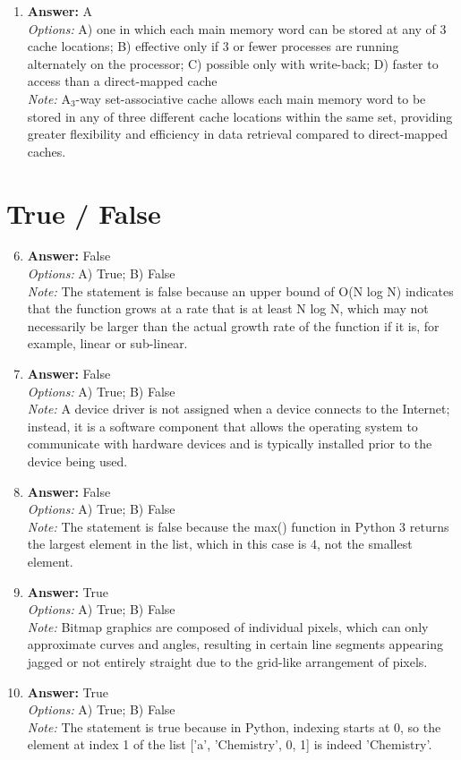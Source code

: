 \documentclass[12pt]{article}
\begin{document}
\begin{enumerate}[label=\arabic*.]
\item \textbf{Answer:} A
\\ \textit{Options:} A) one in which each main memory word can be stored at any of 3 cache locations; B) effective only if 3 or fewer processes are running alternately on the processor; C) possible only with write-back; D) faster to access than a direct-mapped cache
\\ \textit{Note:} A$_{3}$-way set-associative cache allows each main memory word to be stored in any of three different cache locations within the same set, providing greater flexibility and efficiency in data retrieval compared to direct-mapped caches.
\end{enumerate}

\section*{True / False}
\begin{enumerate}[label=\arabic*.]
\setcounter{enumi}{5}
\item \textbf{Answer:} False
\\ \textit{Options:} A) True; B) False
\\ \textit{Note:} The statement is false because an upper bound of O(N log N) indicates that the function grows at a rate that is at least N log N, which may not necessarily be larger than the actual growth rate of the function if it is, for example, linear or sub-linear.
\item \textbf{Answer:} False
\\ \textit{Options:} A) True; B) False
\\ \textit{Note:} A device driver is not assigned when a device connects to the Internet; instead, it is a software component that allows the operating system to communicate with hardware devices and is typically installed prior to the device being used.
\item \textbf{Answer:} False
\\ \textit{Options:} A) True; B) False
\\ \textit{Note:} The statement is false because the max() function in Python 3 returns the largest element in the list, which in this case is 4, not the smallest element.
\item \textbf{Answer:} True
\\ \textit{Options:} A) True; B) False
\\ \textit{Note:} Bitmap graphics are composed of individual pixels, which can only approximate curves and angles, resulting in certain line segments appearing jagged or not entirely straight due to the grid-like arrangement of pixels.
\item \textbf{Answer:} True
\\ \textit{Options:} A) True; B) False
\\ \textit{Note:} The statement is true because in Python, indexing starts at 0, so the element at index 1 of the list ['a', 'Chemistry', 0, 1] is indeed 'Chemistry'.
\end{enumerate}
\end{document}
